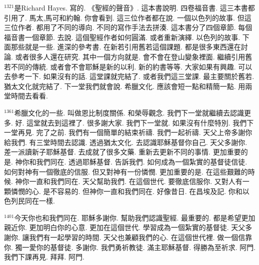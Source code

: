 \documentclass{book}
\begin{document}
$^{1321}$是Richard Hayes.
寫的.
《聖經的聲音》.
這本書說明.
四卷福音書.
這三本書都引用了.
馬太,馬可和約翰.
你會看到.
這三位作者都在說.
一個以色列的故事.
但這三位作者.
都用了不同的導向.
不同的寫作手法去拼湊.
這本書分了四個章節.
每個福音書一個章節.
去說.
這個聖經作者如何圓滿.
或者重新演繹.
以色列的故事.
下面那些就是一些.
進深的參考書.
在新若引用舊若這個課題.
都是很多東西還在討論.
或者很多人還在研究.
其中一個方向就是.
會不會在登山變象裡面.
繼續引用舊若不同的傳統.
或者會不會耶穌是新的以利.
新的約書等等.
大家如果有興趣.
可以去參考一下.
如果沒有的話.
這堂課就完結了.
或者我們這三堂課.
最主要關於舊若.
猶太文化就完結了.
下一堂我們就會說.
希臘文化.
應該會短一點和精簡一點.
用兩堂時間去看看.

$^{1361}$希臘文化的一些.
叫做恩比制度關係.
和榮辱觀念.
我們下一堂就繼續去認識更多.
好.
這堂就去到這裡了.
很多謝大家.
我們下一堂就.
如果沒有什麼特別.
我們下一堂再見.
完了之前.
我們有一個簡單的結束祈禱.
我們一起祈禱.
天父上帝多謝你給我們.
有三堂時間去認識.
透過猶太文化.
去認識耶穌基督你自己.
天父多謝你.
差一派讀新子耶穌基督.
去成就了很多文藥.
重新去更新不同的事情.
更加重要的是.
神你和我們同在.
透過耶穌基督.
告訴我們.
如何成為一個紮實的基督徒信徒.
如何對神有一個徹底的信服.
但又對神有一份憐憫.
更加重要的是.
在這些艱難的時候.
神你一直和我們同在.
天父幫助我們.
在這個世代.
要徹底信服你.
又對人有一顆憐憫的心.
是不容易的.
但神你一直和我們同在.
好像昔日.
在昌埃及記.
你和以色列民同在一樣.

$^{1401}$今天你也和我們同在.
耶穌多謝你.
幫助我們認識聖經.
最重要的.
都是希望更加親近你.
更加明白你的心意.
更加在這個世代.
學習成為一個紮實的基督徒.
天父多謝你.
讓我們有一起學習的時間.
天父也兼顧我們的心.
在這個世代裡.
做一個信靠你.
獨一愛你的基督徒.
多謝你.
我們勇祈教徒.
滿主耶穌基督.
得勝為至祈求.
阿門.
我們下課再見.
拜拜.
阿門.
\newpage
\end{document}
